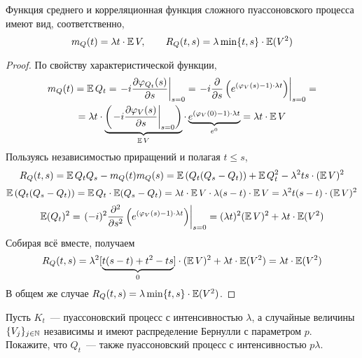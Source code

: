 \begin{corollary}
    \label{corollary:special:compound_Poisson_process_moments}
    Функция среднего и корреляционная функция сложного пуассоновского процесса имеют вид, соответственно,
    \[
        m_Q(t) = \lambda t \cdot \operatorname{\mathbb{E}} V, \qquad
        R_Q(t, s) = \lambda \min\{t,s\} \cdot \operatorname{\mathbb{E}} (V^2)
    \]
\end{corollary}

\begin{proof}
    По свойству характеристической функции,
    \begin{multline*}
        m_Q(t) = \operatorname{\mathbb{E}} Q_t = \left . -i \frac{\partial \varphi_{Q_t}(s)}{\partial s} \right|_{s = 0} =
        \left. -i \frac{\partial}{\partial s} \left( e^{(\varphi_V(s) - 1) \cdot \lambda t} \right) \right|_{s = 0} = \\
        = \lambda t \cdot \underbrace{\left( \left. - i \frac{\partial \varphi_V(s)}{\partial s} \right|_{s = 0} \right)}_{\operatorname{\mathbb{E}} V} \cdot
            \underbrace{e^{(\varphi_V(0) - 1) \cdot \lambda t}}_{e^0} =
        \lambda t \cdot \operatorname{\mathbb{E}} V
    \end{multline*}
    Пользуясь независимостью приращений и полагая $ t \leqslant s $,
    \[
        R_Q(t,s) = \operatorname{\mathbb{E}} Q_t Q_s - m_Q(t) m_Q(s) = \operatorname{\mathbb{E}} \left( Q_t (Q_s - Q_t) \right) + \operatorname{\mathbb{E}} Q_t^2 - \lambda^2 t s \cdot (\operatorname{\mathbb{E}} V)^2
    \]
    \[
        \operatorname{\mathbb{E}} \left( Q_t (Q_s - Q_t) \right) = \operatorname{\mathbb{E}} Q_t \cdot \operatorname{\mathbb{E}} (Q_s - Q_t) = \lambda t \cdot \operatorname{\mathbb{E}} V \cdot \lambda (s - t) \cdot \operatorname{\mathbb{E}} V = \lambda^2 t (s - t) \cdot (\operatorname{\mathbb{E}} V)^2
    \]
    \[
        \operatorname{\mathbb{E}} (Q_t)^2 = \left. (- i)^2 \frac{\partial^2}{\partial s^2} \left( e^{(\varphi_V(s) - 1) \cdot \lambda t} \right) \right|_{s = 0} = (\lambda t)^2 (\operatorname{\mathbb{E}} V)^2 + \lambda t \cdot \operatorname{\mathbb{E}} (V^2)
    \]
    Собирая всё вместе, получаем
    \[
        R_Q(t,s) = \lambda^2 [ \underbrace{t(s - t) + t^2 - ts}_{0} ] \cdot (\operatorname{\mathbb{E}} V)^2 + \lambda t \cdot \operatorname{\mathbb{E}} (V^2) = \lambda t \cdot \operatorname{\mathbb{E}} (V^2)
    \]
    В общем же случае $ R_Q(t, s) = \lambda \min\{t,s\} \cdot \operatorname{\mathbb{E}} (V^2) $.
\end{proof}

\begin{exercise}[subtitle={(Прореживание пуассоновского процесса)}]
    \label{exercise:special:Poisson_process_decimation}
    Пусть $ K_t $~--- пуассоновский процесс с интенсивностью $ \lambda $,
    а случайные величины $ \{V_j\}_{j \in \mathbb{N}} $ независимы и имеют распределение Бернулли с параметром $ p $.
    Покажите, что $ Q_t $~--- также пуассоновский процесс с интенсивностью $ p \lambda $.
\end{exercise}

